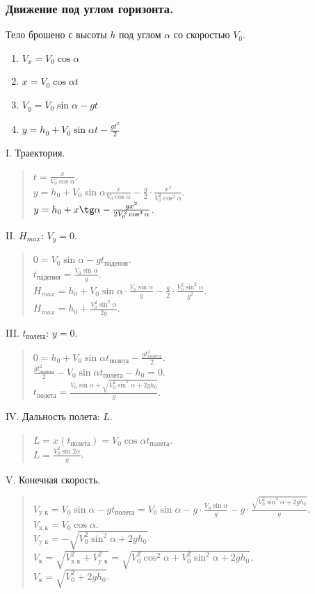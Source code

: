 \documentclass{article}
\begin{document}
	\subsubsection{Движение под углом горизонта.}
	Тело брошено с высоты $h$ под углом $\alpha$ со скоростью $V_0$.
	\begin{enumerate}
		\item $V_x = V_0 \cos\alpha$
		\item $x = V_0 \cos\alpha t$
		\item $V_y = V_0 \sin\alpha - gt$
		\item $y = h_0 + V_0 \sin\alpha t - \frac{gt^2}{2}$
	\end{enumerate}
	I. Траектория.
	\begin{quote}
		$t = \frac{x}{V_0 \cos\alpha}$. \\
		$y = h_0 + V_0 \sin\alpha \frac{x}{V_0 \cos\alpha} - \frac{g}{2} \cdot \frac{x^2}{V_0^2 \cos^2\alpha}$. \\
		$y = h_0 + x \tg\alpha - \frac{gx^2}{2V_0^2\cos^2\alpha}$. \\
	\end{quote}
	II. $H_{max}$: $V_{y} = 0$.
	\begin{quote}
		$0 = V_0 \sin\alpha - gt_{\text{падения}}$. \\
		$t_{\text{падения}} = \frac{V_0 \sin\alpha}{g}$. \\
		$H_{max} = h_0 + V_0 \sin\alpha \cdot \frac{V_0 \sin\alpha}{g} - \frac{g}{2} \cdot \frac{V_0^2 \sin^2\alpha}{g^2}$. \\
		$H_{max} = h_0 + \frac{V_0^2 \sin^2\alpha}{2g}$. \\
	\end{quote}
	III. $t_{\text{полета}}$: $y = 0$.
	\begin{quote}
		$0 = h_0 + V_0 \sin\alpha t_{\text{полета}} - \frac{gt_{\text{полета}}^2}{2}$. \\
		$\frac{gt_{\text{полета}}^2}{2} - V_0 \sin\alpha t_{\text{полета}} - h_0 = 0$. \\
		$t_{\text{полета}} = \frac{V_0 \sin\alpha + \sqrt{V_0^2\sin^2\alpha + 2gh_0}}{g}$. \\
	\end{quote}
	IV. Дальность полета: $L$.
	\begin{quote}
		$L = x(t_{\text{полета}}) = V_0 \cos\alpha t_{\text{полета}}$. \\
		$L = \frac{V_0^2 \sin2\alpha}{g}$. \\
	\end{quote}
	V. Конечная скорость.
	\begin{quote}
		$V_{\text{y к}} = V_0 \sin\alpha - gt_{\text{полета}} = V_0 \sin\alpha - g \cdot \frac{V_0 \sin\alpha}{g} - g \cdot \frac{\sqrt{V_0^2 \sin^2\alpha + 2gh_0}}{g}$. \\
		$V_{\text{x к}} = V_0 \cos\alpha$. \\
		$V_{\text{y к}} = -\sqrt{V_0^2 \sin^2\alpha + 2gh_0}$. \\
		$V_{\text{к}} = \sqrt{V_{\text{x к}}^2 + V_{\text{y к}}^2} = \sqrt{V_0^2 \cos^2\alpha + V_0^2 \sin^2\alpha + 2gh_0}$. \\
		$V_{\text{к}} = \sqrt{V_0^2 + 2gh_0}$. \\
	\end{quote}
\end{document}

